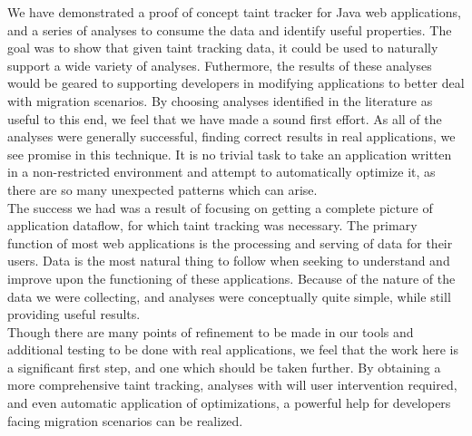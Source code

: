 \documentclass[msc,oneside]{ubcthesis}
\begin{document}
We have demonstrated a proof of concept taint tracker for Java web applications, and a series of analyses to consume the data and identify useful properties. The goal was to show that given taint tracking data, it could be used to naturally support a wide variety of analyses. Futhermore, the results of these analyses would be geared to supporting developers in modifying applications to better deal with migration scenarios. By choosing analyses identified in the literature as useful to this end, we feel that we have made a sound first effort. As all of the analyses were generally successful, finding correct results in real applications, we see promise in this technique. It is no trivial task to take an application written in a non-restricted environment and attempt to automatically optimize it, as there are so many unexpected patterns which can arise.\\

The success we had was a result of focusing on getting a complete picture of application dataflow, for which taint tracking was necessary. The primary function of most web applications is the processing and serving of data for their users. Data is the most natural thing to follow when seeking to understand and improve upon the functioning of these applications. Because of the nature of the data we were collecting, and analyses were conceptually quite simple, while still providing useful results.\\

Though there are many points of refinement to be made in our tools and additional testing to be done with real applications, we feel that the work here is a significant first step, and one which should be taken further. By obtaining a more comprehensive taint tracking, analyses with will user intervention required, and even automatic application of optimizations, a powerful help for developers facing migration scenarios can be realized.


\end{document}
